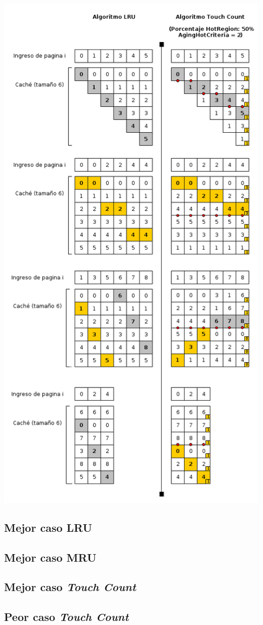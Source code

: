 \documentclass[11pt, a4paper, spanish]{article}
\begin{document}
	\begin{center}
	\includegraphics[scale=0.65]{diagramas/LRUvsTouchCountAll.png}\\
	\end{center}


	\subsection{ Mejor caso LRU}
	\subsection{ Mejor caso MRU}
	\subsection{ Mejor caso \textit{Touch Count}}
	\subsection{ Peor caso \textit{Touch Count}}
\end{document}
